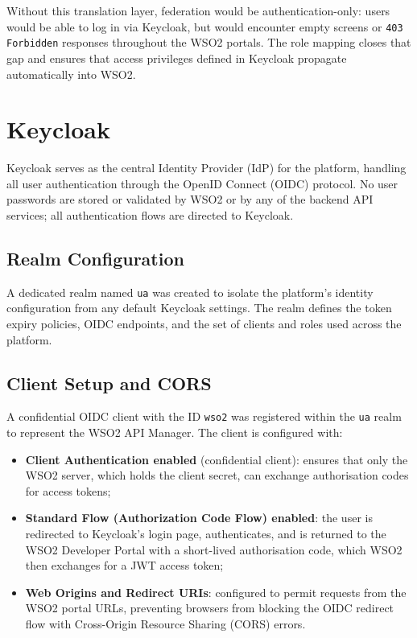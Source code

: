 \documentclass[12pt, a4paper]{report}
\begin{document}
Without this translation layer, federation would be authentication-only: users would be
able to log in via Keycloak, but would encounter empty screens or \texttt{403 Forbidden}
responses throughout the WSO2 portals. The role mapping closes that gap and ensures
that access privileges defined in Keycloak propagate automatically into WSO2.

\section{Keycloak}
Keycloak serves as the central Identity Provider (IdP) for the platform, handling all
user authentication through the OpenID Connect (OIDC) protocol. No user passwords are
stored or validated by WSO2 or by any of the backend API services; all authentication
flows are directed to Keycloak.

\subsection{Realm Configuration}
A dedicated realm named \texttt{ua} was created to isolate the platform's identity
configuration from any default Keycloak settings. The realm defines the token expiry
policies, OIDC endpoints, and the set of clients and roles used across the platform.

\subsection{Client Setup and CORS}
A confidential OIDC client with the ID \texttt{wso2} was registered within the
\texttt{ua} realm to represent the WSO2 API Manager. The client is configured with:
\begin{itemize}
    \item \textbf{Client Authentication enabled} (confidential client): ensures that
          only the WSO2 server, which holds the client secret, can exchange authorisation
          codes for access tokens;
    \item \textbf{Standard Flow (Authorization Code Flow) enabled}: the user is
          redirected to Keycloak's login page, authenticates, and is returned to the
          WSO2 Developer Portal with a short-lived authorisation code, which WSO2 then
          exchanges for a JWT access token;
    \item \textbf{Web Origins and Redirect URIs}: configured to permit requests from the
          WSO2 portal URLs, preventing browsers from blocking the OIDC redirect flow
          with Cross-Origin Resource Sharing (CORS) errors.
\end{itemize}
\end{document}
